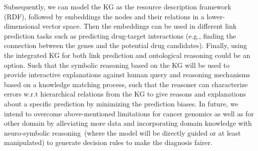 \hspace*{5mm} Subsequently, we can model the KG as the resource description framework (RDF), followed by embeddings the nodes and their relations in a lower-dimensional vector space. Then the embeddings can be used in different link prediction tasks such as predicting drug-target interactions (e.g., finding the connection between the genes and the potential drug candidates). Finally, using the integrated KG for both link prediction and ontological reasoning could be an option. Such that the symbolic reasoning based on the KG will be used to provide interactive explanations against human query and reasoning mechanisms based on a knowledge matching process, such that the reasoner can characterize errors w.r.t hierarchical relations from the KG to give reasons and explanations about a specific prediction by minimizing the prediction biases. In future, we intend to overcome above-mentioned limitations for cancer genomics as well as for other domain by alleviating more data and incorporating domain knowledge with neuro-symbolic reasoning~(where the model will be directly guided or at least manipulated) to generate decision rules to make the diagnosis fairer. 